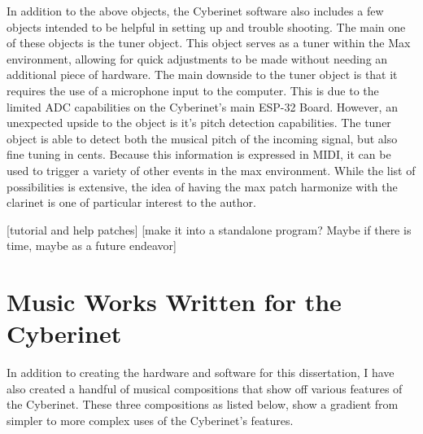 In addition to the above objects, the Cyberinet software also includes a few objects intended to be helpful in setting up and trouble shooting. The main one of these objects is the tuner object. This object serves as a tuner within the Max environment, allowing for quick adjustments to be made without needing an additional piece of hardware. 
The main downside to the tuner object is that it requires the use of a microphone input to the computer. This is due to the limited ADC capabilities on the Cyberinet's main ESP-32 Board. However, an unexpected upside to the object is it's pitch detection capabilities. The tuner object is able to detect both the musical pitch of the incoming signal, but also fine tuning in cents. Because this information is expressed in MIDI, it can be used to trigger a variety of other events in the max environment. While the list of possibilities is extensive, the idea of having the max patch harmonize with the clarinet is one of particular interest to the author.

[tutorial and help patches]
[make it into a standalone program? Maybe if there is time, maybe as a future endeavor]

\chapter{Music Works Written for the Cyberinet}

In addition to creating the hardware and software for this dissertation, I have also created a handful of musical compositions that show off various features of the Cyberinet. These three compositions as listed below, show a gradient from simpler to more complex uses of the Cyberinet’s features.

